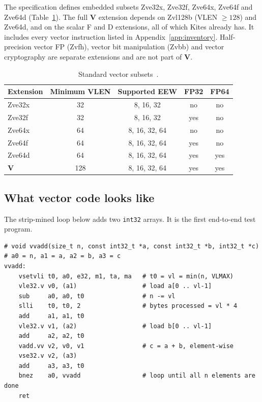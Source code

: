 \documentclass[11pt]{article}
\begin{document}
The specification defines embedded subsets Zve32x, Zve32f, Zve64x, Zve64f and Zve64d (Table~\ref{tab:zve}).
The full \textbf{V} extension depends on Zvl128b (VLEN $\ge 128$) and Zve64d, and on the scalar F and D
extensions, all of which Kites already has. It includes every vector instruction listed in
Appendix~\ref{app:inventory}. Half-precision vector FP (Zvfh), vector bit manipulation (Zvbb) and
vector cryptography are separate extensions and are not part of \textbf{V}.

\begin{table}[htbp]
\centering\small
\caption{Standard vector subsets~\cite{spec}.}\label{tab:zve}
\begin{tabular}{@{}lcccc@{}}
\toprule
Extension & Minimum VLEN & Supported EEW & FP32 & FP64 \\
\midrule
Zve32x & 32 & 8, 16, 32 & no & no \\
Zve32f & 32 & 8, 16, 32 & yes & no \\
Zve64x & 64 & 8, 16, 32, 64 & no & no \\
Zve64f & 64 & 8, 16, 32, 64 & yes & no \\
Zve64d & 64 & 8, 16, 32, 64 & yes & yes \\
\midrule
\textbf{V} & 128 & 8, 16, 32, 64 & yes & yes \\
\bottomrule
\end{tabular}
\end{table}

\subsection{What vector code looks like}

The strip-mined loop below adds two \texttt{int32} arrays. It is the first
end-to-end test program.

\noindent\begin{minipage}{\linewidth}
\begin{lstlisting}[language=rvasm]
# void vvadd(size_t n, const int32_t *a, const int32_t *b, int32_t *c)
# a0 = n, a1 = a, a2 = b, a3 = c
vvadd:
    vsetvli t0, a0, e32, m1, ta, ma   # t0 = vl = min(n, VLMAX)
    vle32.v v0, (a1)                  # load a[0 .. vl-1]
    sub     a0, a0, t0                # n -= vl
    slli    t0, t0, 2                 # bytes processed = vl * 4
    add     a1, a1, t0
    vle32.v v1, (a2)                  # load b[0 .. vl-1]
    add     a2, a2, t0
    vadd.vv v2, v0, v1                # c = a + b, element-wise
    vse32.v v2, (a3)
    add     a3, a3, t0
    bnez    a0, vvadd                 # loop until all n elements are done
    ret
\end{lstlisting}
\end{minipage}
\end{document}
